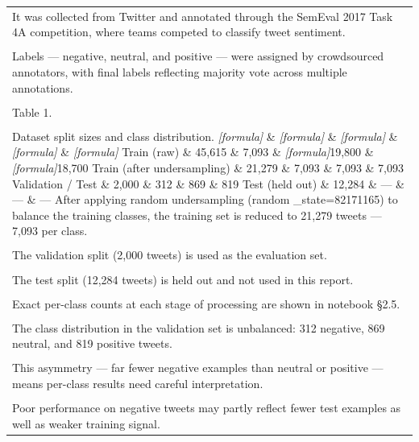 \documentclass[11pt,a4paper,landscape]{article}
\begin{document}
\begin{longtable}{|p{\dimexpr\linewidth-2\tabcolsep-2\arrayrulewidth\relax}|}
\hline
\rule{0pt}{3.5cm} \\
\hline
It was collected from Twitter and annotated through the SemEval 2017 Task 4A competition, where teams competed to classify tweet sentiment. \\[2pt]
\hline
\rule{0pt}{3.5cm} \\
\hline
Labels --- negative, neutral, and positive --- were assigned by crowdsourced annotators, with final labels reflecting majority vote across multiple annotations. \\[2pt]
\hline
\rule{0pt}{3.5cm} \\
\hline
Table 1. \\[2pt]
\hline
\rule{0pt}{3.5cm} \\
\hline
Dataset split sizes and class distribution. \textit{[formula]} \& \textit{[formula]} \& \textit{[formula]} \& \textit{[formula]} \& \textit{[formula]} Train (raw) \& 45,615 \& 7,093 \& \textit{[formula]}19,800 \& \textit{[formula]}18,700 Train (after undersampling) \& 21,279 \& 7,093 \& 7,093 \& 7,093 Validation / Test \& 2,000 \& 312 \& 869 \& 819 Test (held out) \& 12,284 \& --- \& --- \& --- After applying random undersampling (random \_state=82171165) to balance the training classes, the training set is reduced to 21,279 tweets --- 7,093 per class. \\[2pt]
\hline
\rule{0pt}{3.5cm} \\
\hline
The validation split (2,000 tweets) is used as the evaluation set. \\[2pt]
\hline
\rule{0pt}{3.5cm} \\
\hline
The test split (12,284 tweets) is held out and not used in this report. \\[2pt]
\hline
\rule{0pt}{3.5cm} \\
\hline
Exact per-class counts at each stage of processing are shown in notebook §2.5. \\[2pt]
\hline
\rule{0pt}{3.5cm} \\
\hline
The class distribution in the validation set is unbalanced: 312 negative, 869 neutral, and 819 positive tweets. \\[2pt]
\hline
\rule{0pt}{3.5cm} \\
\hline
This asymmetry --- far fewer negative examples than neutral or positive --- means per-class results need careful interpretation. \\[2pt]
\hline
\rule{0pt}{3.5cm} \\
\hline
Poor performance on negative tweets may partly reflect fewer test examples as well as weaker training signal. \\[2pt]

\end{longtable}
\end{document}
